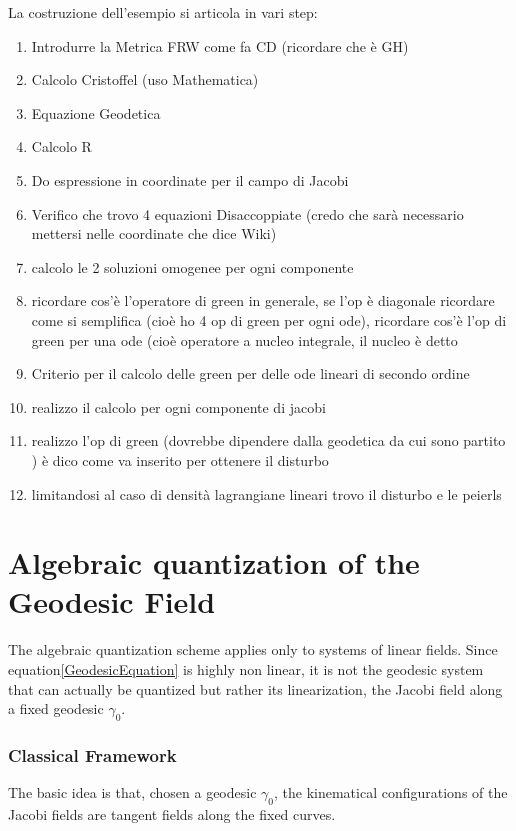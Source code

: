 \documentclass[Main]{subfiles}
\begin{document}
	\begin{Warning}
		La costruzione dell'esempio si articola in vari step:
		\begin{enumerate}
			\item Introdurre la Metrica FRW come fa CD (ricordare che è GH)
			\item Calcolo Cristoffel (uso Mathematica)
			\item Equazione Geodetica
			\item Calcolo R
			\item Do espressione in coordinate per il campo di Jacobi
			\item Verifico che trovo 4 equazioni Disaccoppiate (credo che sarà necessario mettersi nelle coordinate che dice Wiki)
			\item calcolo le 2 soluzioni omogenee per ogni componente
			\item ricordare cos'è l'operatore di green in generale, se l'op è diagonale ricordare come si semplifica (cioè ho 4 op di green per ogni ode), ricordare cos'è l'op di green per una ode (cioè operatore  a nucleo integrale, il nucleo è detto 
			\item Criterio per il calcolo delle green per delle ode lineari di secondo ordine
			\item realizzo il calcolo per ogni componente di jacobi
			\item realizzo l'op di green (dovrebbe dipendere dalla geodetica da cui sono partito ) è dico come va inserito per ottenere il disturbo
			\item limitandosi al caso di densità lagrangiane lineari trovo il disturbo e le peierls
		\end{enumerate}
	\end{Warning}
	

\section{Algebraic quantization of the Geodesic Field}
	The algebraic quantization scheme applies only to %
	systems of linear fields.
	Since equation\ref{GeodesicEquation} is highly non linear,  it is not the geodesic system that can actually be quantized but rather its linearization, the Jacobi field along a fixed geodesic $\gamma_0$.
	
		\subsubsection{Classical Framework}
			The basic idea is that, chosen a geodesic $\gamma_0$, the kinematical configurations of the Jacobi fields are tangent fields along the fixed curves.
\end{document}
